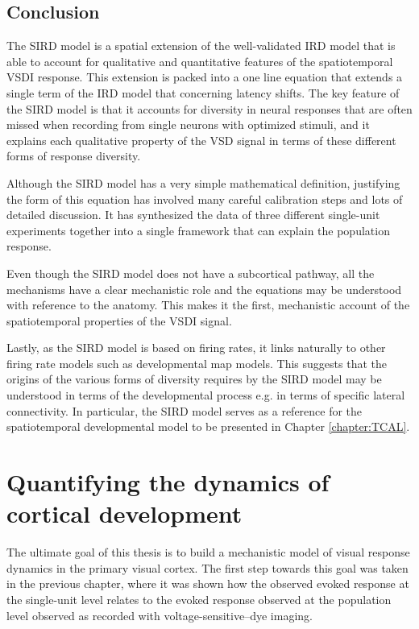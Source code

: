 \documentclass[phd,ianc,twoside]{infthesis}
\begin{document}
\section{Conclusion}

The SIRD model is a spatial extension of the well-validated IRD model
that is able to account for qualitative and quantitative features of the
spatiotemporal VSDI response. This extension is packed into a one line
equation that extends a single term of the IRD model that concerning
latency shifts. The key feature of the SIRD model is that it accounts
for diversity in neural responses that are often missed when recording
from single neurons with optimized stimuli, and it explains each
qualitative property of the VSD signal in terms of these different forms
of response diversity.

Although the SIRD model has a very simple mathematical definition,
justifying the form of this equation has involved many careful
calibration steps and lots of detailed discussion. It has synthesized
the data of three different single-unit experiments together into a
single framework that can explain the population response.

Even though the SIRD model does not have a subcortical pathway, all the
mechanisms have a clear mechanistic role and the equations may be
understood with reference to the anatomy. This makes it the first,
mechanistic account of the spatiotemporal properties of the VSDI signal.

Lastly, as the SIRD model is based on firing rates, it links naturally
to other firing rate models such as developmental map models. This
suggests that the origins of the various forms of diversity requires by
the SIRD model may be understood in terms of the developmental process
e.g. in terms of specific lateral connectivity.  In particular, the SIRD
model serves as a reference for the spatiotemporal developmental model
to be presented in Chapter \ref{chapter:TCAL}.

\chapter{Quantifying the dynamics of cortical development}
\label{chapter:GCAL}

The ultimate goal of this thesis is to build a mechanistic model of
visual response dynamics in the primary visual cortex. The first step
towards this goal was taken in the previous chapter, where it was shown
how the observed evoked response at the single-unit level relates to the
evoked response observed at the population level observed as recorded
with voltage-sensitive--dye imaging.
\end{document}
